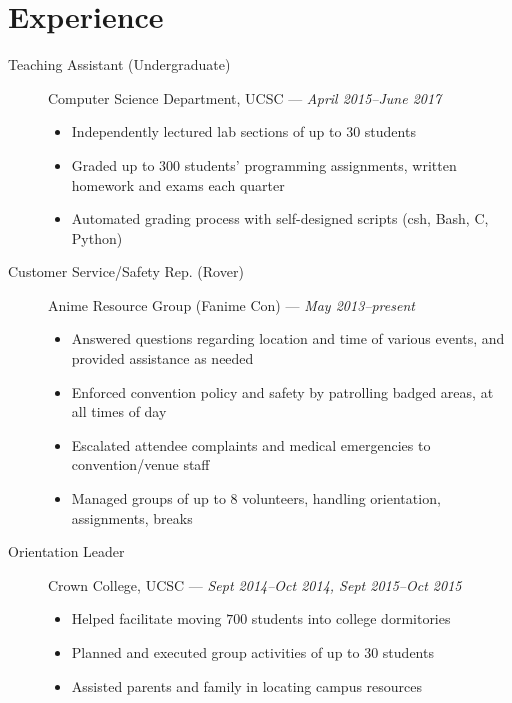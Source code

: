 \documentclass[10pt]{article}
\begin{document}
\section*{Experience}
\begin{description}
  \item[Teaching Assistant (Undergraduate)] Computer Science Department, UCSC ---
    \textit{April 2015--June 2017}
    \begin{itemize}
      \item Independently lectured lab sections of up to $30$ students
      \item Graded up to $300$ students' programming assignments, written
        homework and exams each quarter
      \item Automated grading process with self-designed scripts (csh, Bash, C,
        Python)
    \end{itemize}
  \item[Customer Service/Safety Rep. (Rover)] Anime Resource Group (Fanime Con) --- \textit{May 2013--present}
    \begin{itemize}
      \item Answered questions regarding location and time of various events,
        and provided assistance as needed
      \item Enforced convention policy and safety by patrolling badged areas, at
        all times of day
      \item Escalated attendee complaints and medical emergencies to
        convention/venue staff
      \item Managed groups of up to $8$ volunteers, handling orientation,
        assignments, breaks
    \end{itemize}
  \item[Orientation Leader] Crown College, UCSC --- \textit{Sept 2014--Oct
    2014, Sept 2015--Oct 2015}
    \begin{itemize}
      \item Helped facilitate moving $700$ students into college dormitories
      \item Planned and executed group activities of up to $30$ students
      \item Assisted parents and family in locating campus resources
    \end{itemize}
\end{description}
\end{document}

